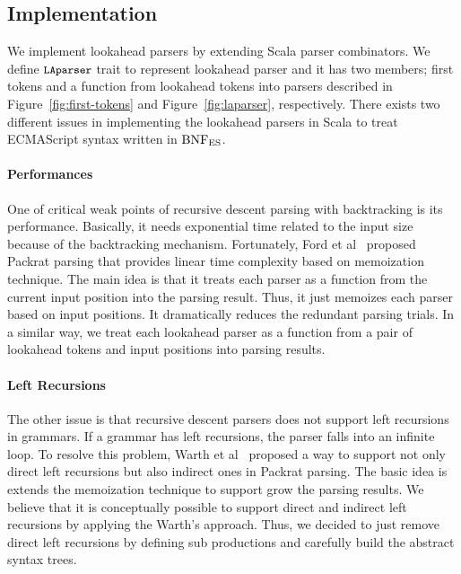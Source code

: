 \subsection{Implementation}

We implement lookahead parsers by extending Scala parser combinators.
We define \( \texttt{\small LAparser} \) trait to represent lookahead parser
and it has two members; first tokens and a function from lookahead tokens into parsers
described in Figure~\ref{fig:first-tokens} and Figure~\ref{fig:laparser}, respectively.
There exists two different issues in implementing the lookahead parsers in Scala
to treat ECMAScript syntax written in \( \text{BNF}_{\text{ES}} \).

\paragraph{Performances} One of critical weak points of recursive descent parsing
with backtracking is its performance. Basically, it needs exponential time related
to the input size because of the backtracking mechanism. Fortunately,
Ford et al~\cite{packrat} proposed Packrat parsing that provides linear
time complexity based on memoization technique. The main idea is that it treats
each parser as a function from the current input position into the parsing result.
Thus, it just memoizes each parser based on input positions. It dramatically reduces
the redundant parsing trials. In a similar way, we treat each lookahead parser as
a function from a pair of lookahead tokens and input positions into parsing results.

\paragraph{Left Recursions} The other issue is that recursive descent parsers
does not support left recursions in grammars. If a grammar has left recursions,
the parser falls into an infinite loop. To resolve this problem,
Warth et al~\cite{packrat-lr} proposed a way to support not only direct left
recursions but also indirect ones in Packrat parsing.
The basic idea is extends the memoization technique to support grow the parsing
results. We believe that it is conceptually possible to support direct and indirect
left recursions by applying the Warth's approach.
Thus, we decided to just remove direct left recursions by defining sub productions
and carefully build the abstract syntax trees.

